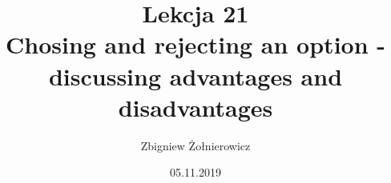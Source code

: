 \documentclass[a4paper]{article}
\begin{document}
\title{{\huge Lekcja 21} \\
{\large Chosing and rejecting an option - discussing advantages and disadvantages}}
\author{Zbigniew Żołnierowicz}
\date{05.11.2019}
\maketitle
\end{document}
